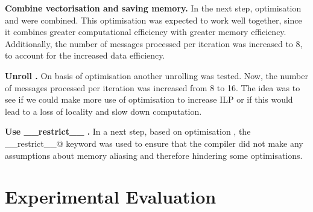 \documentclass[draft,letterpaper]{article}
\newcommand{\mypar}[1]{{\bf #1.}}
\begin{document}
\mypar{Combine vectorisation and saving memory}
In the next step, optimisation  and  were combined. This optimisation was expected to work well together, since it combines greater computational efficiency with greater memory efficiency. Additionally, the number of messages processed per iteration was increased to 8, to account for the increased data efficiency.


\mypar{Unroll }
On basis of optimisation  another unrolling was tested. Now, the number of messages processed per iteration was increased from 8 to 16. The idea was to see if we could make more use of optimisation  to increase ILP or if this would lead to a loss of locality and slow down computation.


\mypar{Use \_\_restrict\_\_ }
In a next step, based on optimisation , the \verb@__restrict__@ keyword was used to ensure that the compiler did not make any assumptions about memory aliasing and therefore hindering some optimisations.

%
%
%
%


\section{Experimental Evaluation}\label{sec:exp}
\end{document}
